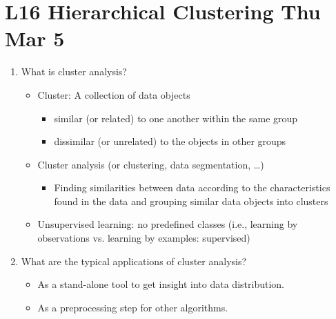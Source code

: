 \documentclass[12pt]{article}
\newenvironment{QandA}{\begin{enumerate}[label=\bfseries\arabic*.]\bfseries}
{\end{enumerate}}
\newenvironment{answered}{\par\normalfont\color{Sepia}}{}
\begin{document}
\section*{L16 Hierarchical Clustering \textemdash{} Thu Mar 5}
\begin{QandA}
    \item What is cluster analysis?
    \begin{answered}
        \begin{itemize}
            \item Cluster: A collection of data objects
            \begin{itemize}
                \item similar (or related) to one another within the same group
                \item dissimilar (or unrelated) to the objects in other groups
            \end{itemize}
            \item Cluster analysis (or clustering, data segmentation, \ldots)
            \begin{itemize}
                \item Finding similarities between data according to the characteristics found in the
                      data and grouping similar data objects into clusters
            \end{itemize}
            \item Unsupervised learning: no predefined classes
                  (i.e., learning by observations vs. learning by examples: supervised)
        \end{itemize}
    \end{answered}

    \item What are the typical applications of cluster analysis?
    \begin{answered}
        \begin{itemize}
            \item As a stand-alone tool to get insight into data distribution.
            \item As a preprocessing step for other algorithms.
        \end{itemize}
    \end{answered}


\end{QandA}
\end{document}
